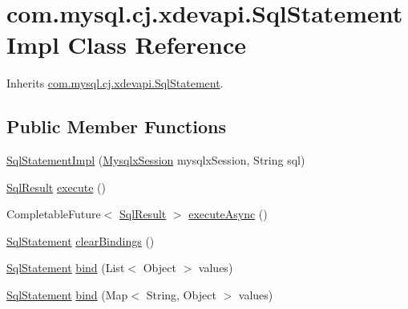 \hypertarget{classcom_1_1mysql_1_1cj_1_1xdevapi_1_1_sql_statement_impl}{}\section{com.\+mysql.\+cj.\+xdevapi.\+Sql\+Statement\+Impl Class Reference}
\label{classcom_1_1mysql_1_1cj_1_1xdevapi_1_1_sql_statement_impl}


Inherits \mbox{\hyperlink{interfacecom_1_1mysql_1_1cj_1_1xdevapi_1_1_sql_statement}{com.\+mysql.\+cj.\+xdevapi.\+Sql\+Statement}}.

\subsection*{Public Member Functions}
\begin{DoxyCompactItemize}
\item 
\mbox{\hyperlink{classcom_1_1mysql_1_1cj_1_1xdevapi_1_1_sql_statement_impl_a8b75ae45fafd1c45ae83df6f8f8fbaac}{Sql\+Statement\+Impl}} (\mbox{\hyperlink{classcom_1_1mysql_1_1cj_1_1_mysqlx_session}{Mysqlx\+Session}} mysqlx\+Session, String sql)
\item 
\mbox{\hyperlink{interfacecom_1_1mysql_1_1cj_1_1xdevapi_1_1_sql_result}{Sql\+Result}} \mbox{\hyperlink{classcom_1_1mysql_1_1cj_1_1xdevapi_1_1_sql_statement_impl_abf7f15bd1993d310b1f1522c1c16d984}{execute}} ()
\item 
Completable\+Future$<$ \mbox{\hyperlink{interfacecom_1_1mysql_1_1cj_1_1xdevapi_1_1_sql_result}{Sql\+Result}} $>$ \mbox{\hyperlink{classcom_1_1mysql_1_1cj_1_1xdevapi_1_1_sql_statement_impl_aa041eeb7c8c37ed627555fdd1efd02a7}{execute\+Async}} ()
\item 
\mbox{\hyperlink{interfacecom_1_1mysql_1_1cj_1_1xdevapi_1_1_sql_statement}{Sql\+Statement}} \mbox{\hyperlink{classcom_1_1mysql_1_1cj_1_1xdevapi_1_1_sql_statement_impl_a88391cba8359c2f03bb97e2b9c60aedd}{clear\+Bindings}} ()
\item 
\mbox{\hyperlink{interfacecom_1_1mysql_1_1cj_1_1xdevapi_1_1_sql_statement}{Sql\+Statement}} \mbox{\hyperlink{classcom_1_1mysql_1_1cj_1_1xdevapi_1_1_sql_statement_impl_a447b9cc7892837bc103804b9f4beb824}{bind}} (List$<$ Object $>$ values)
\item 
\mbox{\hyperlink{interfacecom_1_1mysql_1_1cj_1_1xdevapi_1_1_sql_statement}{Sql\+Statement}} \mbox{\hyperlink{classcom_1_1mysql_1_1cj_1_1xdevapi_1_1_sql_statement_impl_aeabc1e48ee6dc58b527f313c70bc6c0c}{bind}} (Map$<$ String, Object $>$ values)
\end{DoxyCompactItemize}


